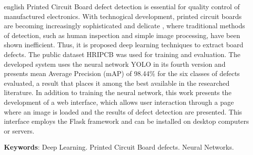 \documentclass[
	12pt,				%
	openright,			%
	oneside,			%
	a4paper,			%
	chapter=TITLE,		%
	english,			%
	french,				%
	spanish,			%
	brazil				%
	]{abntex2}
\begin{document}
\begin{resumo}[Abstract]
 \begin{otherlanguage*}{english}
    Printed Circuit Board defect detection is essential for quality control of manufactured electronics. With technogical development, printed circuit boards are becoming increasingly sophisticated and delicate \cite{ref:Hu-Wang}, where traditional methods of detection, such as human inspection and simple image processing, have been shown inefficient. Thus, it is proposed deep learning techniques to extract board defects. The public dataset HRIPCB was used for training and evaluation. The developed system uses the neural network YOLO in its fourth version and presents mean Average Precision (mAP) of 98.44\% for the six classes of defects evaluated, a result that places it among the best available in the researched literature. In addition to training the neural network, this work presents the development of a web interface, which allows user interaction through a page where an image is loaded and the results of defect detection are presented. This interface employs the Flask framework and can be installed on desktop computers or servers.

   \vspace{\onelineskip}

   \noindent
   \textbf{Keywords}: Deep Learning. Printed Circuit Board defects. Neural Networks.
 \end{otherlanguage*}
\end{resumo}


\listoffigures*
\cleardoublepage

\listoftables*
\cleardoublepage

\listoflistings
\cleardoublepage
\end{document}

